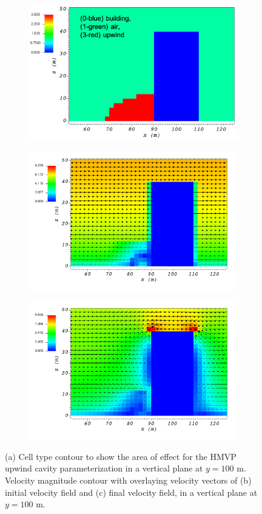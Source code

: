 \begin{figure}[H]
    \centering
    \begin{subfigure}{\textwidth}
    \centering
    \includegraphics[width=10.3cm,keepaspectratio]{Images/upwind_y_100_3_init_icell.png}
    \caption{}
    \end{subfigure}
    \begin{subfigure}{\textwidth}
    \centering
    \includegraphics[width=11.0cm,keepaspectratio]{Images/upwind_y_100_3_init_vel.png}
    \caption{}
    \end{subfigure}
    \begin{subfigure}{\textwidth}
    \centering
    \includegraphics[width=11.0cm,keepaspectratio]{Images/upwind_y_100_3_final.png}
    \caption{}
    \end{subfigure}
    \caption{(a) Cell type contour to show the area of effect for the HMVP upwind cavity parameterization in a vertical plane at $y=100$ m. Velocity magnitude contour with overlaying velocity vectors of (b) initial velocity field and (c) final velocity field, in a vertical plane at $y=100$ m.}
\end{figure}

